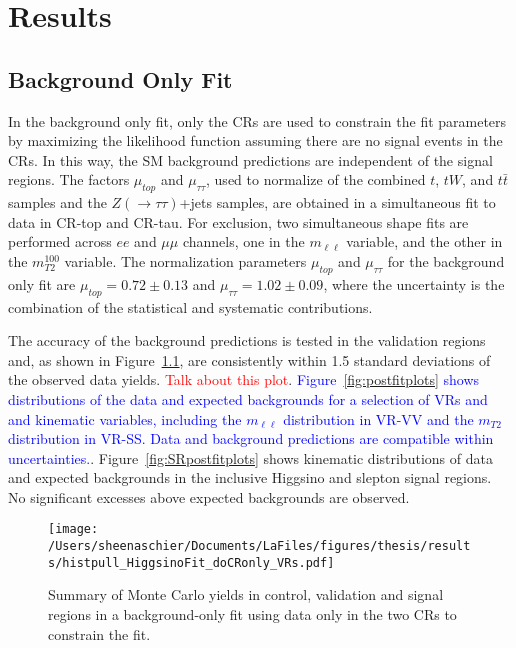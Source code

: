 \chapter{Results}
\label{ch:results}
\section{Background Only Fit}
In the background only fit, only the CRs are used to constrain the fit parameters by maximizing the likelihood function assuming there are no signal events in the CRs.  In this way, the SM background predictions are independent of the signal regions.  The factors $\mu_{top}$ and $\mu_{\tau\tau}$, used to normalize of the combined $t$, $tW$, and  $t\bar{t}$ samples and the  $Z(\rightarrow\tau\tau)$+jets samples, are obtained in a simultaneous fit to data in CR-top and CR-tau.  For exclusion, two simultaneous shape fits are performed across $ee$ and $\mu\mu$ channels, one in the $m_{\ell\ell}$ variable, and the other in the $m_{T2}^{100}$ variable.   The normalization parameters $\mu_{top}$ and $\mu_{\tau\tau}$ for the background only fit are $\mu_{top} = 0.72\pm0.13$ and $\mu_{\tau\tau} = 1.02\pm0.09$, where the uncertainty is the combination of the statistical and systematic contributions.

The accuracy of the background predictions is tested in the validation regions and, as shown in Figure~\ref{fig:pull_plot_summary_yields}, are consistently within 1.5 standard deviations of the observed data yields.  \textcolor{red}{Talk about this plot}. \textcolor{blue}{ Figure~\ref{fig:postfitplots} shows distributions of the data and expected backgrounds for a selection of VRs and and kinematic variables, including the $m_{\ell\ell}$ distribution in VR-VV and the $m_{T2}$ distribution in VR-SS.  Data and background predictions are compatible within uncertainties.}.  Figure~\ref{fig:SRpostfitplots} shows kinematic distributions of data and expected backgrounds in the inclusive Higgsino and slepton signal regions.  No significant excesses above expected backgrounds are observed.


\begin{figure}
 \centering
\texttt{[image: /Users/sheenaschier/Documents/LaFiles/figures/thesis/results/histpull\_HiggsinoFit\_doCRonly\_VRs.pdf]}
   \caption{Summary of Monte Carlo yields in control, validation and signal regions in a background-only fit using data only in the two CRs to constrain the fit.}
  \label{fig:pull_plot_summary_yields}
 \end{figure}

